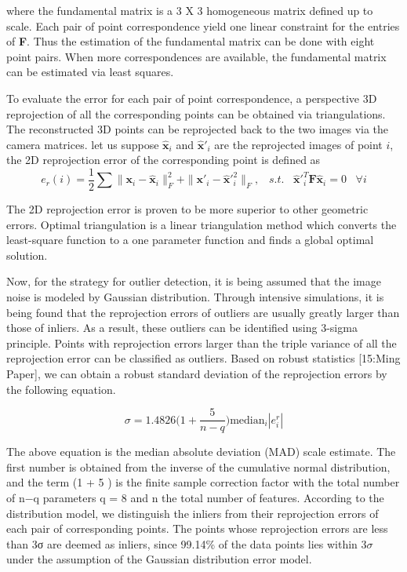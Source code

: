 where the fundamental matrix is a 3 X 3 homogeneous matrix defined up to scale. Each pair of point correspondence yield one linear constraint for the entries of \textbf{F}. Thus the estimation of the fundamental matrix can be done with eight point pairs. When more correspondences are available, the fundamental matrix can be estimated via least squares. 

To evaluate the error for each pair of point correspondence, a perspective 3D reprojection of all the corresponding points can be obtained via triangulations. The reconstructed 3D points can be reprojected back to the two images via the camera matrices. let us suppose $\mathbf{\hat{x}}_i$ and $\mathbf{\hat{x}}'_i$ are the reprojected images of point $i$, the 2D reprojection error of the corresponding point is defined as
\begin{equation}
e_{r}(i) = \frac{1}{2} \sum \|\mathbf{x}_i-\mathbf{\hat{x}}_i\|^2_F + \|\mathbf{x}'_i-\mathbf{\hat{x}}'^2_i\|_F, \;\;\;s.t.\;\;\; 
\mathbf{\hat{x}}'^T_i \mathbf{F} \mathbf{\hat{x}}_i=0 \;\;\; \forall i
\end{equation}


The 2D reprojection error is proven to be more superior to other geometric errors. Optimal triangulation is a linear triangulation method which converts the least-square function to a one parameter function and finds a global optimal solution.

Now, for the strategy for outlier detection, it is being assumed that the image noise is modeled by Gaussian distribution. Through intensive simulations, it is being found that the reprojection errors of outliers are usually greatly larger than those of inliers. As a result, these outliers can be identified using 3-sigma principle. Points with reprojection errors larger than the triple variance of all the reprojection error can be classified as outliers. Based on robust statistics [15:Ming Paper], we can obtain a robust standard deviation of the reprojection errors by the following equation.

\begin{equation}
\sigma = 1.4826 \Big(1+\frac{5}{n-q}\Big)\text{median}_i|e^r_i|
\end{equation}

The above equation is the median absolute deviation (MAD) scale estimate.
The first number is obtained from the inverse of the cumulative normal distribution,
and the term (1 + 5 ) is the finite sample correction factor with the total number of n−q
parameters q = 8 and n the total number of features. According to the distribution model, we distinguish the inliers from their reprojection errors of each pair of corresponding points. The points whose reprojection errors are less than 3σ are deemed as inliers, since 99.14{\%} of the data points lies within 3$\sigma$ under the assumption of the Gaussian distribution error model.

